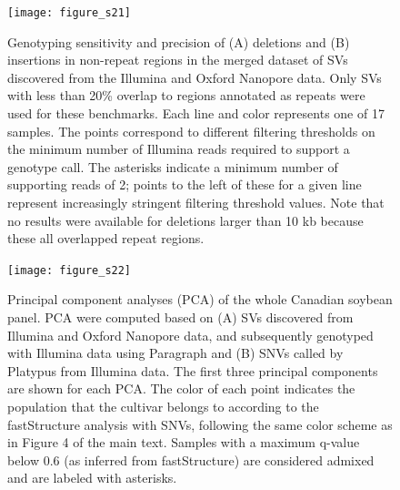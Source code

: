 \documentclass[12pt]{article}
\newenvironment{cfigure}
	{\begin{figure} \centering}
	{\end{figure}}
\newenvironment{lsfigure}
	{\begin{landscape} \begin{figure} \centering}
	{\end{figure} \end{landscape}}
\begin{document}
\begin{lsfigure}
	\texttt{[image: figure\_s21]}

	\caption[Sensitivity and precision of joint Illumina/Oxford Nanopore deletion and insertion genotyping in non-repeat regions]{
		Genotyping sensitivity and precision of (A) deletions and (B) insertions in non-repeat regions in the merged dataset of SVs discovered from the Illumina and Oxford Nanopore data. 
		Only SVs with less than 20\% overlap to regions annotated as repeats were used for these benchmarks. 
		Each line and color represents one of 17 samples. 
		The points correspond to different filtering thresholds on the minimum number of Illumina reads required to support a genotype call.
		The asterisks indicate a minimum number of supporting reads of 2; points to the left of these for a given line represent increasingly stringent filtering threshold values.
		Note that no results were available for deletions larger than 10 kb because these all overlapped repeat regions.
	}

	\label{fig_s21}
\end{lsfigure}

\clearpage%

\begin{cfigure}
	\texttt{[image: figure\_s22]}

	\caption[Principal component analyses (PCA) of the whole Canadian soybean panel]{
		Principal component analyses (PCA) of the whole Canadian soybean panel.
		PCA were computed based on (A) SVs discovered from Illumina and Oxford Nanopore data, and subsequently genotyped with Illumina data using Paragraph and (B) SNVs called by Platypus from Illumina data.
		The first three principal components are shown for each PCA. 
		The color of each point indicates the population that the cultivar belongs to according to the fastStructure analysis with SNVs, following the same color scheme as in Figure 4 of the main text.
		Samples with a maximum q-value below 0.6 (as inferred from fastStructure) are considered admixed and are labeled with asterisks.
	}

	\label{fig_s22}

\end{cfigure}
\end{document}
